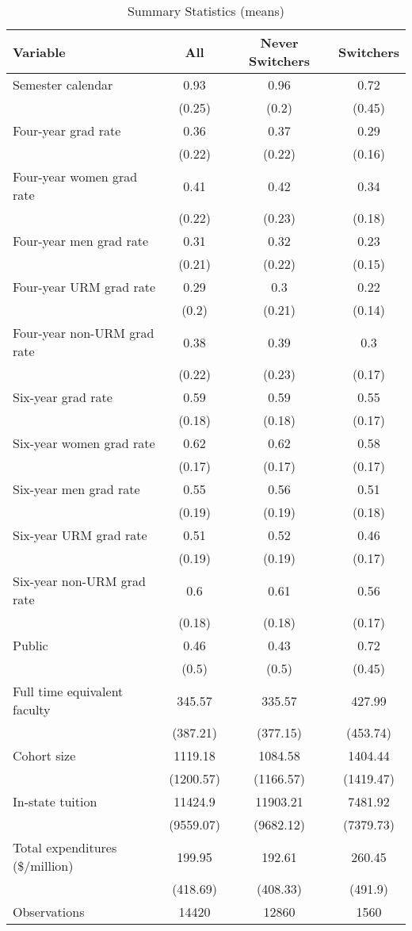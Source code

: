 \documentclass{article}
\begin{document}

\begin{table}[htbp]
\centering
\caption{Summary Statistics (means)}
\label{sumstat_wide}
\begin{tabular}{lccc}
\hline\hline
\textbf{Variable} & \textbf{All} & \textbf{Never Switchers} & \textbf{Switchers} \\
\hline
Semester calendar & 0.93 & 0.96 & 0.72 \\
 & (0.25) & (0.2) & (0.45) \\
Four-year grad rate & 0.36 & 0.37 & 0.29 \\
 & (0.22) & (0.22) & (0.16) \\
Four-year women grad rate & 0.41 & 0.42 & 0.34 \\
 & (0.22) & (0.23) & (0.18) \\
Four-year men grad rate & 0.31 & 0.32 & 0.23 \\
 & (0.21) & (0.22) & (0.15) \\
Four-year URM grad rate & 0.29 & 0.3 & 0.22 \\
 & (0.2) & (0.21) & (0.14) \\
Four-year non-URM grad rate & 0.38 & 0.39 & 0.3 \\
 & (0.22) & (0.23) & (0.17) \\
Six-year grad rate & 0.59 & 0.59 & 0.55 \\
 & (0.18) & (0.18) & (0.17) \\
Six-year women grad rate & 0.62 & 0.62 & 0.58 \\
 & (0.17) & (0.17) & (0.17) \\
Six-year men grad rate & 0.55 & 0.56 & 0.51 \\
 & (0.19) & (0.19) & (0.18) \\
Six-year URM grad rate & 0.51 & 0.52 & 0.46 \\
 & (0.19) & (0.19) & (0.17) \\
Six-year non-URM grad rate & 0.6 & 0.61 & 0.56 \\
 & (0.18) & (0.18) & (0.17) \\
Public & 0.46 & 0.43 & 0.72 \\
 & (0.5) & (0.5) & (0.45) \\
Full time equivalent faculty & 345.57 & 335.57 & 427.99 \\
 & (387.21) & (377.15) & (453.74) \\
Cohort size & 1119.18 & 1084.58 & 1404.44 \\
 & (1200.57) & (1166.57) & (1419.47) \\
In-state tuition & 11424.9 & 11903.21 & 7481.92 \\
 & (9559.07) & (9682.12) & (7379.73) \\
Total expenditures (\$/million) & 199.95 & 192.61 & 260.45 \\
 & (418.69) & (408.33) & (491.9) \\
 \midrule
 \vspace{3pt}
 Observations & 14420 & 12860 & 1560 \\
\hline\hline
\end{tabular}
\end{table}
\end{document}
